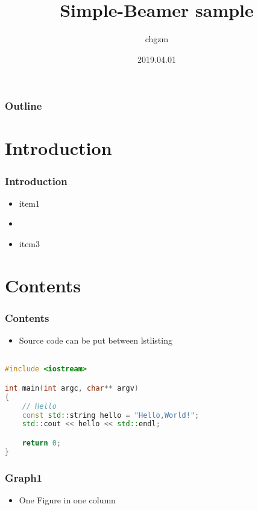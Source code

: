 \documentclass[12pt]{beamer}
\begin{document}
\title{Simple-Beamer sample}
\author{{\large chgzm}}
\date{2019.04.01}

\begin{frame}
  \titlepage
\end{frame}

\begin{frame}
  \frametitle{Outline}

  \tableofcontents
\end{frame}

\section{Introduction}
\begin{frame}
  \frametitle{Introduction}

  \begin{itemize}
    \item item1
    \item {}
    \item \alert{item3}
  \end{itemize}
\end{frame}

\section{Contents}

\begin{frame}[fragile]
  \frametitle{Contents}

  \begin{itemize}
    \item Source code can be put between \alert{lstlisting}
  \end{itemize}

  \begin{lstlisting}[language={C++}]

#include <iostream>

int main(int argc, char** argv)
{
    // Hello
    const std::string hello = "Hello,World!";
    std::cout << hello << std::endl;

    return 0;
}

  \end{lstlisting}
\end{frame}

\begin{frame}
  \frametitle{Graph1}

  \begin{itemize}
    \item One Figure in one column
  \end{itemize}

\end{frame}
\end{document}
